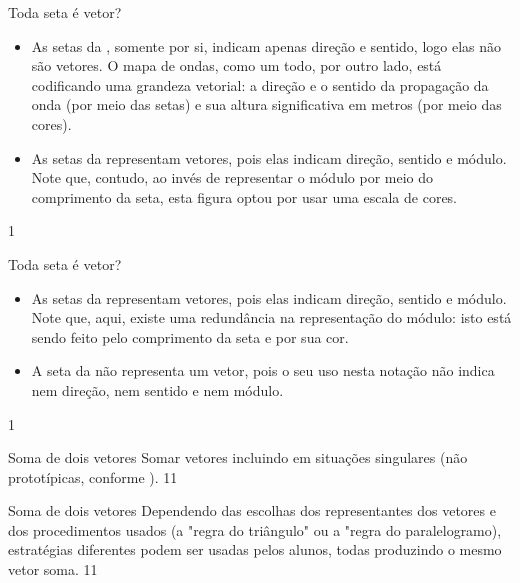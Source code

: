 \clearmargin
\begin{answer}{Toda seta é vetor?}
{
\begin{itemize}
\item {} 
As setas da \hyperref[\detokenize{GE101-0C:fig-geometria-flechas-06}]{}, somente por si, indicam apenas direção e sentido, logo elas não são vetores. O mapa de ondas, como um todo, por outro lado, está codificando uma grandeza vetorial: a direção e o sentido da propagação da onda (por meio das setas) e sua altura significativa em metros (por meio das cores).

\item {} 
As setas da \hyperref[\detokenize{GE101-0C:fig-geometria-flechas-07}]{} representam vetores, pois elas indicam direção, sentido e módulo. Note que, contudo, ao invés de representar o módulo por meio do comprimento da seta, esta figura optou por usar uma escala de cores.
\end{itemize}
}{1}
\end{answer}
\clearmargin
\marginpar{\vspace{.5em}}
\begin{answer}{Toda seta é vetor?}
{
\begin{itemize}
\item {} 
As setas da \hyperref[\detokenize{GE101-0C:fig-geometria-flechas-03}]{}  representam vetores, pois elas indicam direção, sentido e módulo. Note que, aqui, existe uma redundância na representação do módulo: isto está sendo feito pelo comprimento da seta e por sua cor.

\item {} 
A seta da \hyperref[\detokenize{GE101-0C:fig-geometria-flechas-08}]{} não representa um vetor, pois o seu uso nesta notação não indica nem direção, nem sentido e nem módulo.
\end{itemize}
}{1}
\end{answer}
\begin{objectives}{Soma de dois vetores}
{
Somar vetores incluindo em situações singulares (não prototípicas, conforme \citet{poynter2005}).
}{1}{1}
\end{objectives}
\marginpar{\vspace{-2em}}
\begin{sugestions}{Soma de dois vetores}
{
Dependendo das escolhas dos representantes dos vetores e dos procedimentos usados (a "regra do triângulo"{} ou a "regra do paralelogramo), estratégias diferentes podem ser usadas pelos alunos, todas produzindo o mesmo vetor soma.
}{1}{1}
\end{sugestions}
